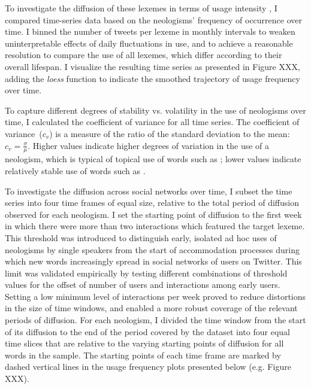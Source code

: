 \documentclass[
  a4paper,
  abstract=on,
  captions=tableabove
  ]{scrartcl}
\begin{document}
  To investigate the diffusion of these lexemes in terms of usage intensity \parencite{Stefanowitsch2017CorpusbasedPerspective}, I compared time-series data based on the neologisms' frequency of occurrence over time. I binned the number of tweets per lexeme in monthly intervals to weaken uninterpretable effects of daily fluctuations in use, and to achieve a reasonable resolution to compare the use of all lexemes, which differ according to their overall lifespan. I visualize the resulting time series as presented in Figure XXX, adding the \emph{loess} function to indicate the smoothed trajectory of usage frequency over time.

  To capture different degrees of stability vs. volatility in the use of neologisms over time, I calculated the coefficient of variance for all time series. The coefficient of variance~($c_{v}$) is a measure of the ratio of the standard deviation to the mean: $c_{v} = \frac{\sigma}{\mu}$. Higher values indicate higher degrees of variation in the use of a neologism, which is typical of topical use of words such as ; lower values indicate relatively stable use of words such as .

  To investigate the diffusion across social networks over time, I subset the time series into four time frames of equal size, relative to the total period of diffusion observed for each neologism. I set the starting point of diffusion to the first week in which there were more than two interactions which featured the target lexeme. This threshold was introduced to distinguish early, isolated ad hoc uses of neologisms by single speakers from the start of accommodation processes during which new words increasingly spread in social networks of users on Twitter. This limit was validated empirically by testing different combinations of threshold values for the offset of number of users and interactions among early users. Setting a low minimum level of interactions per week proved to reduce distortions in the size of time windows, and enabled a more robust coverage of the relevant periods of diffusion. For each neologism, I divided the time window from the start of its diffusion to the end of the period covered by the dataset into four equal time slices that are relative to the varying starting points of diffusion for all words in the sample. The starting points of each time frame are marked by dashed vertical lines in the usage frequency plots presented below (e.g. Figure XXX).
\end{document}
